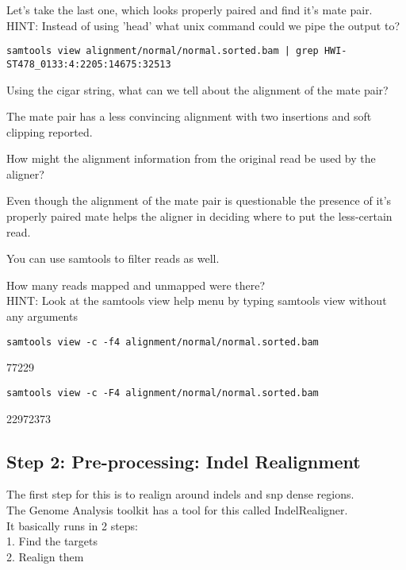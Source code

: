 \begin{questions} 
Let's take the last one, which looks properly paired and find it's mate pair. \\
HINT: Instead of using 'head' what unix command could we pipe the output to?
\end{questions}
\begin{answer}
\begin{lstlisting}
samtools view alignment/normal/normal.sorted.bam | grep HWI-ST478_0133:4:2205:14675:32513
\end{lstlisting}
\end{answer}

\begin{questions} 
Using the cigar string, what can we tell about the alignment of the mate pair?
\end{questions}
\begin{answer}
The mate pair has a less convincing alignment with two insertions and soft clipping reported.
\end{answer}

\begin{questions} 
How might the alignment information from the original read be used by the aligner?
\end{questions}
\begin{answer}
Even though the alignment of the mate pair is questionable the presence of it's properly paired mate helps the aligner in deciding where to put the less-certain read. 
\end{answer}

You can use samtools to filter reads as well.

\begin{questions} 
How many reads mapped and unmapped were there? \\
HINT: Look at the samtools view help menu by typing samtools view without any arguments
\end{questions}
\begin{answer}
\begin{lstlisting}
samtools view -c -f4 alignment/normal/normal.sorted.bam
\end{lstlisting}
77229
\begin{lstlisting}
samtools view -c -F4 alignment/normal/normal.sorted.bam
\end{lstlisting}
22972373
\end{answer}

\subsection{Step 2: Pre-processing: Indel Realignment}
The first step for this is to realign around indels and snp dense regions.\\
The Genome Analysis toolkit has a tool for this called IndelRealigner. \\
It basically runs in 2 steps: \\
   1. Find the targets \\
   2. Realign them \\

